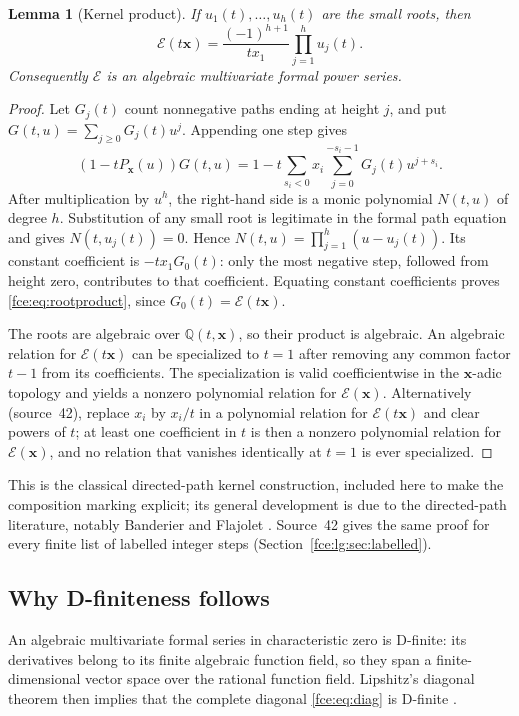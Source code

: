 \documentclass[11pt,a4paper]{article}
\numberwithin{equation}{section}
\newtheorem{lemma}[theorem]{Lemma}
\theoremstyle{definition}\newtheorem{definition}[theorem]{Definition}
\theoremstyle{remark}\newtheorem{remark}[theorem]{Remark}
\newcommand{\Q}{\mathbb Q}
\newcommand{\E}{\mathcal E}
\begin{document}
\begin{lemma}[Kernel product]\label{fce:lem:kernel}
If $u_1(t),\ldots,u_h(t)$ are the small roots, then
\begin{equation}\label{fce:eq:rootproduct}
 \E(t\boldsymbol x)=
 \frac{(-1)^{h+1}}{t x_1}\prod_{j=1}^h u_j(t).
\end{equation}
Consequently $\E$ is an algebraic multivariate formal power series.
\end{lemma}
\begin{proof}
Let $G_j(t)$ count nonnegative paths ending at height $j$, and put
$G(t,u)=\sum_{j\ge0}G_j(t)u^j$. Appending one step gives
\[
 (1-tP_{\boldsymbol x}(u))G(t,u)
 =1-t\sum_{s_i<0}x_i\sum_{j=0}^{-s_i-1}G_j(t)u^{j+s_i}.
\]
After multiplication by $u^h$, the right-hand side is a monic polynomial
$N(t,u)$ of degree $h$. Substitution of any small root is legitimate in
the formal path equation and gives $N(t,u_j(t))=0$. Hence
$N(t,u)=\prod_{j=1}^h(u-u_j(t))$. Its constant coefficient is
$-t x_1G_0(t)$: only the most negative step, followed from height zero,
contributes to that coefficient. Equating constant coefficients proves
\eqref{fce:eq:rootproduct}, since $G_0(t)=\E(t\boldsymbol x)$.

The roots are algebraic over $\Q(t,\boldsymbol x)$, so their product is
algebraic. An algebraic relation for $\E(t\boldsymbol x)$ can be specialized
to $t=1$ after removing any common factor $t-1$ from its coefficients.
The specialization is valid coefficientwise in the $\boldsymbol x$-adic
topology and yields a nonzero polynomial relation for $\E(\boldsymbol x)$.
Alternatively (source~42), replace $x_i$ by $x_i/t$ in a polynomial
relation for $\E(t\boldsymbol x)$ and clear powers of $t$; at least one
coefficient in $t$ is then a nonzero polynomial relation for
$\E(\boldsymbol x)$, and no relation that vanishes identically at $t=1$ is
ever specialized.
\end{proof}
This is the classical directed-path kernel construction, included here to
make the composition marking explicit; its general development is due to
the directed-path literature, notably Banderier and Flajolet \cite{bf}.
Source~42 gives the same proof for every finite list of labelled integer
steps (Section~\ref{fce:lg:sec:labelled}).

\subsection{Why D-finiteness follows}
An algebraic multivariate formal series in characteristic zero is
D-finite: its derivatives belong to its finite algebraic function field,
so they span a finite-dimensional vector space over the rational function
field. Lipshitz's diagonal theorem then implies that the complete diagonal
\eqref{fce:eq:diag} is D-finite \cite{lipshitz}.
\end{document}
